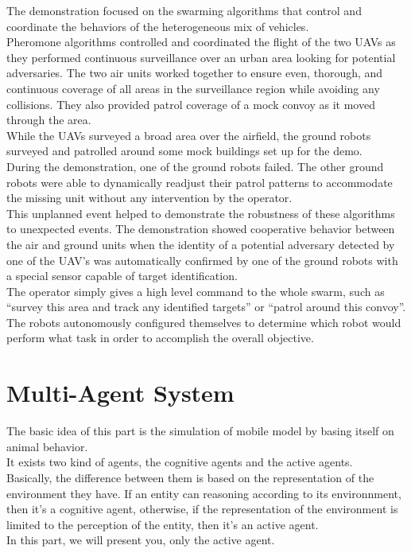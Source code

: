 The demonstration focused on the swarming algorithms that control and coordinate the behaviors of the heterogeneous mix of vehicles.\\
Pheromone  algorithms  controlled  and  coordinated  the  flight  of  the  two  UAVs  as  they performed continuous  surveillance  over  an  urban  area  looking  for  potential  adversaries. The  two  air  units worked together to ensure even, thorough, and continuous coverage of all areas in the surveillance region  while  avoiding  any  collisions. They  also  provided  patrol coverage  of  a  mock  convoy  as  it moved through the area.\\ 
While the UAVs surveyed a broad area over the airfield, the ground robots surveyed and patrolled around  some  mock  buildings  set  up  for  the  demo.\\
During  the  demonstration,  one  of  the  ground robots  failed. The other  ground  robots were  able  to  dynamically  readjust  their  patrol  patterns to accommodate  the  missing  unit without  any  intervention  by  the  operator.\\
This unplanned  event helped to demonstrate the robustness of these algorithms to unexpected events. The  demonstration  showed  cooperative  behavior  between  the  air  and  ground  units when  the identity of a potential adversary detected by one of the UAV’s was automatically confirmed by one of the ground robots with a special sensor capable of target identification.\\
The operator simply gives a high level command to the whole swarm, such as “survey this area and track  any  identified  targets”  or  “patrol  around  this  convoy”.\\
The  robots  autonomously  configured themselves to determine which robot would perform what task in order to accomplish the overall objective.

\newpage

\section{Multi-Agent System}

The basic idea of this part is the simulation of mobile model by basing itself on animal behavior.\\
It exists two kind of agents, the cognitive agents and the active agents.\\
Basically, the difference  between them is based on the representation of the environment they have. If an entity can reasoning according to its environnment, then it's a cognitive agent, otherwise, if the representation of the environment is limited to the perception of the entity, then it's an active agent.\\
In this part, we will present you, only the active agent.\\

